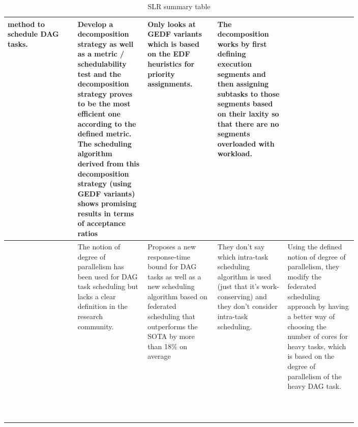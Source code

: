 \begin{table}
\begin{tabular}[]{|l|p{0.20\linewidth}|p{0.20\linewidth}|p{0.20\linewidth}|p{0.20\linewidth}|}
        method to schedule DAG tasks. & Develop a decomposition strategy
        as well as a metric / schedulability test 
        and the decomposition strategy proves to be the most efficient one
        according to the defined metric. The scheduling algorithm
        derived from this decomposition strategy (using GEDF variants) shows promising
        results in terms of acceptance ratios & Only looks at GEDF variants which is based on the EDF heuristics for priority assignments.& The decomposition works by first defining execution segments
        and then assigning subtasks to those segments based on their laxity so that there are no segments overloaded with workload. \\
        \hline
        \cite{He2023DegreeOfParallelism} & The notion of degree of parallelism has been used 
        for DAG task scheduling but lacks a clear definition in the research community. & Proposes a new response-time bound for DAG tasks
        as well as a new scheduling algorithm based on federated scheduling that outperforms the SOTA
        by more than 18\% on average & They don't say which intra-task scheduling algorithm is used (just that it's work-conserving)
        and they don't consider intra-task scheduling. & Using the defined notion of degree of parallelism,
        they modify the federated scheduling approach by having a better way of choosing
        the number of cores for heavy tasks, which is based on the degree of parallelism of the heavy DAG task. \\
        \hline
        \cite{Shi2024DagExecGroups}  & & & & \\
        \hline
        \cite{Guan2023FederatedNew}  & & & & \\
        \hline
        \cite{Zhao2024GATDRLmodel}  & & & & \\
        \hline
        \cite{Xu2023DRLtaskSched}  & & & & \\
        \hline
        \cite{Zhao2022DAGsched}  & & & & \\
        \hline
        \cite{Lee2021GlobalDagSchedDRL}  & & & & \\
        \hline
        \cite{Jiang2023SchedVirtualProcs}  & & & & \\
        \hline
        \cite{GuanFluidDag2022}  & & & & \\
        \hline
        \cite{GuanFRTDS2020RL}  & & & & \\
        \hline
        \cite{JiangVirtuallyFederatedSched2021}  & & & & \\
        \hline
        \cite{Pazzaglia2021DMALETtransfer} & & & & \\
        \hline
    \end{tabular}
    \caption{SLR summary table}
    \label{tab:slt_sum_table}
\end{table}


